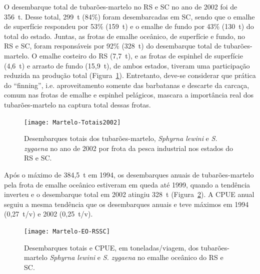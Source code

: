 \documentclass[a4paper,11pt,twoside,showtrims,onecolumn,openright,final]{memoir}
\begin{document}
O desembarque total de tubarões-martelo no RS e SC no ano de 2002 foi de 356~t. 
Desse total, 299~t (84\%) foram desembarcadas em SC, sendo que o emalhe de superfície 
respondeu por 53\% (159~t) e o emalhe de fundo por 43\% (130~t) do total do estado. 
Juntas, as frotas de emalhe oceânico, de superfície e fundo, no RS e SC, foram 
responsáveis por 92\% (328~t) do desembarque total de tubarões-martelo. O emalhe costeiro 
do RS (7,7~t), e as frotas de espinhel de superfície (4,6~t) e arrasto de fundo (15,9~t), 
de ambos estados, tiveram uma participação reduzida %
na produção total (Figura~\ref{fig:desemb-martelo}). Entretanto, deve-se considerar que prática
do ``finning'', i.e. aproveitamento somente das barbatanas e descarte da carcaça, 
comum nas frotas de emalhe e espinhel pelágicos, %
mascara a importância real dos tubarões-martelo na captura total dessas frotas.

%
%

\begin{figure}
\begin{center}
\texttt{[image: Martelo-Totais2002]}
\end{center}
\caption[Desembarques totais de tubarões-martelo no ano de 2002 por frota da pesca industrial.]
        {Desembarques totais dos tubarões-martelo, \emph{Sphyrna lewini} e \emph{S. zygaena}
         no ano de 2002 por frota da pesca industrial nos estados do RS e SC.}
\label{fig:desemb-martelo}
\end{figure}


Após o máximo de 384,5~t em 1994, os desembarques anuais de tubarões-martelo pela frota de 
emalhe oceânico estiveram em queda até 1999, quando a tendência inverteu e 
o desembarque total em 2002 atingiu 328~t (Figura~\ref{fig:emalheoceanico-martelo}).  %
A CPUE anual seguiu a mesma tendência que os desembarques anuais e 
teve máximos em 1994 (0,27~t/v) e 2002 (0,25~t/v).

%
%

\begin{figure}
\begin{center}
\texttt{[image: Martelo-EO-RSSC]}
\end{center}
\caption[Desembarques totais e CPUE dos tubarões-martelo no emalhe oceânico do RS e SC.]
        {Desembarques totais e CPUE, em toneladas/viagem, 
	 dos tubarões-martelo \emph{Sphyrna lewini} e \emph{S. zygaena} no emalhe oceânico do RS e SC.}
\label{fig:emalheoceanico-martelo}
\end{figure}
\end{document}
